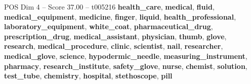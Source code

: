 \begin{textsample}{POS Dim 4 – Score 37.00 – t005216}  \label{ex:f4_pos_001}
\textbf{health\_care}, \textbf{medical}, \textbf{fluid}, \textbf{medical\_equipment}, \textbf{medicine}, \textbf{finger}, \textbf{liquid}, \textbf{health\_professional}, \textbf{laboratory\_equipment}, \textbf{white\_coat}, \textbf{pharmaceutical\_drug}, \textbf{prescription\_drug}, \textbf{medical\_assistant}, \textbf{physician}, \textbf{thumb}, \textbf{glove}, \textbf{research}, \textbf{medical\_procedure}, \textbf{clinic}, \textbf{scientist}, \textbf{nail}, \textbf{researcher}, \textbf{medical\_glove}, \textbf{science}, \textbf{hypodermic\_needle}, \textbf{measuring\_instrument}, \textbf{pharmacy}, \textbf{research\_institute}, \textbf{safety\_glove}, \textbf{nurse}, \textbf{chemist}, \textbf{solution}, \textbf{test\_tube}, \textbf{chemistry}, \textbf{hospital}, \textbf{stethoscope}, \textbf{pill}

\end{textsample}

